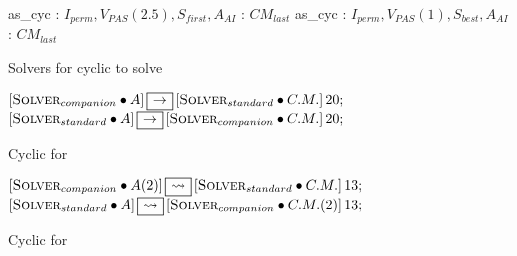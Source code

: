 \begin{algorithm}[H]
\dontprintsemicolon
\SetNoline
{}
   as\_cyc\;
\algoindent {} : $I_{perm}, V_{PAS}(2.5), S_{first}, A_{AI}$ \;
\algoindent {}: $CM_{last}$\;
   as\_cyc\;
\algoindent {} : $I_{perm}, V_{PAS}(1), S_{best}, A_{AI}$ \;
\algoindent {}: $CM_{last}$\;
\caption{Solvers for cyclic \commstr{} to solve \NQP{}}\label{as:nq_cyc}
\end{algorithm}

\begin{algorithm}[H]
\dontprintsemicolon
\SetNoline
$\left[\eqsolverposl{companion}\posldot A\right] \onetoone \left[\eqsolverposl{standard}\posldot C.M.\right]20;$\;
$\left[\eqsolverposl{standard}\posldot A\right] \onetoone \left[\eqsolverposl{companion}\posldot C.M.\right]20;$
\caption{Cyclic \commstr{} \oneTone{} for \NQP}\label{comm:nqueens_cyc_11}
\end{algorithm}

\begin{algorithm}[h]
\dontprintsemicolon
\SetNoline
$\left[\eqsolverposl{companion}\posldot A(2)\right] \oneton \left[\eqsolverposl{standard}\posldot C.M.\right]13;$\;
$\left[\eqsolverposl{standard}\posldot A\right] \oneton \left[\eqsolverposl{companion}\posldot C.M.(2)\right]13;$
\caption{Cyclic \commstr{} \oneTn{} for \NQP}\label{comm:nqueens_cyc_1n}
\end{algorithm}

